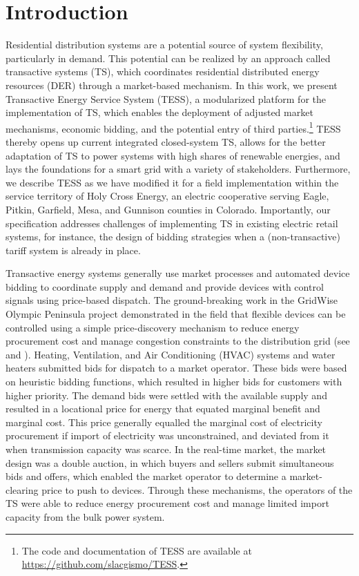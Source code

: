 \documentclass[12pt]{article}{Definitions/mdpi}
\begin{document}

\section{Introduction}

Residential distribution systems are a potential source of system flexibility, particularly in demand. This potential can be realized by an approach called transactive systems (TS), which coordinates residential distributed energy resources (DER) through a market-based mechanism. 
In this work, we present Transactive Energy Service System (TESS), a modularized platform for the implementation of TS, which enables the deployment of adjusted market mechanisms, economic bidding, and the potential entry of third parties.\footnote{The code and documentation of TESS are available at \url{https://github.com/slacgismo/TESS}.} TESS thereby opens up current integrated closed-system TS, allows for the better adaptation of TS to power systems with high shares of renewable energies, and lays the foundations for a smart grid with a variety of stakeholders.
Furthermore, we describe TESS as we have modified it for a field implementation within the service territory of Holy Cross Energy, an electric cooperative serving Eagle, Pitkin, Garfield, Mesa, and Gunnison counties in Colorado. Importantly, our specification addresses challenges of implementing TS in existing electric retail systems, for instance, the design of bidding strategies when a (non-transactive) tariff system is already in place.

Transactive energy systems generally use market processes and automated device bidding to coordinate supply and demand and provide devices with control signals using price-based dispatch. The ground-breaking work in the GridWise Olympic Peninsula project demonstrated in the field that flexible devices can be controlled using a simple price-discovery mechanism to reduce energy procurement cost and manage congestion constraints to the distribution grid (see \citet{PNNL2006} and \citet{hammerstrom_2008}). Heating, Ventilation, and Air Conditioning (HVAC) systems and water heaters submitted bids for dispatch to a market operator. These bids were based on heuristic bidding functions, which resulted in higher bids for customers with higher priority.
The demand bids were settled with the available supply and resulted in a locational price for energy that equated marginal benefit and marginal cost.
This price generally equalled the marginal cost of electricity procurement if import of electricity was unconstrained, and deviated from it when transmission capacity was scarce. In the real-time market, the market design was a double auction, in which buyers and sellers submit simultaneous bids and offers, which enabled the market operator to determine a market-clearing price to push to devices. Through these mechanisms, the operators of the TS were able to reduce energy procurement cost and manage limited import capacity from the bulk power system.
\end{document}
